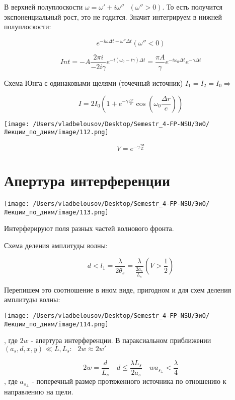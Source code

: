 \documentclass[12pt, a4paper]{report}
\begin{document}
В верхней полуплоскости \( \omega = \omega '+ i \omega '' \text{ }  (\omega '' > 0 ) \). То есть получится экспоненциальный рост, это не годится. Значит интегрируем в нижней полуплоскости: 

\[ e^{- i \omega \Delta t + \omega '' \Delta t } ( \omega'' < 0)  \] 

\[ Int = - A \frac{ 2 \pi i }{- 2 i \gamma } e^{ - i (\omega_0 - i \gamma ) \Delta t } = \frac{\pi A }{\gamma } e^{ - i \omega_0 \Delta t } e^{ - \gamma \Delta t }      \] 

Схема Юнга с одинаковыми щелями  (точечный источник) \( I_1 = I_2 = I_0 \Rightarrow  \) 

\[ I = 2 I_0 \left( 1 + e ^{ - \gamma \frac{\Delta r }{c } } \cos \left( \omega_0 \frac{\Delta r }{c }  \right) \right) \]

\begin{center}
    \texttt{[image: /Users/vladbelousov/Desktop/Semestr\_4-FP-NSU/ЭиО/Лекции\_по\_дням/image/112.png]}
\end{center}

\[ V = e^{ - \gamma \frac{ x d }{L} }  \] 

\section{Апертура интерференции}

\begin{center}
    \texttt{[image: /Users/vladbelousov/Desktop/Semestr\_4-FP-NSU/ЭиО/Лекции\_по\_дням/image/113.png]}
\end{center}
Интерферируют поля разных частей волнового фронта. 


Схема деления амплитуды волны: 

\[ d < l_1 = \frac{\lambda}{2 \theta_s } = \frac{\lambda}{\displaystyle \frac{2a_s}{L_s} }  \left( V>\frac{1}{2}  \right) \] 

Перепишем это соотношение в ином виде, пригодном и для схем деления амплитуды волны: 

\begin{center}
    \texttt{[image: /Users/vladbelousov/Desktop/Semestr\_4-FP-NSU/ЭиО/Лекции\_по\_дням/image/114.png]}
\end{center}
, где \( 2 w  \) - апертура интерференции. В параксиальном приближении \( (a_s , d ,x ,y ) \ll L, L_s : \text{ }  2 w \approx 2 w ' \) 

\[ 2 w = \frac{d}{L_s } \quad  d \le \frac{\lambda L_s}{2 a_{s} } \quad  w a_{s_{\perp } }  <    \frac{\lambda}{4} \] 
, где \( a_{s_{ \perp } }  \) - поперечный размер протяженного источника по отношению к направлению на щели. 
\end{document}
